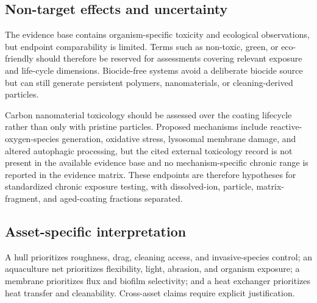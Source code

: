 \subsection{Non-target effects and uncertainty}
The evidence base contains organism-specific toxicity and ecological observations, but endpoint comparability is limited. Terms such as non-toxic, green, or eco-friendly should therefore be reserved for assessments covering relevant exposure and life-cycle dimensions. Biocide-free systems avoid a deliberate biocide source but can still generate persistent polymers, nanomaterials, or cleaning-derived particles.

Carbon nanomaterial toxicology should be assessed over the coating lifecycle rather than only with pristine particles. Proposed mechanisms include reactive-oxygen-species generation, oxidative stress, lysosomal membrane damage, and altered autophagic processing, but the cited external toxicology record is not present in the available evidence base and no mechanism-specific chronic range is reported in the evidence matrix. These endpoints are therefore hypotheses for standardized chronic exposure testing, with dissolved-ion, particle, matrix-fragment, and aged-coating fractions separated.

\subsection{Asset-specific interpretation}
A hull prioritizes roughness, drag, cleaning access, and invasive-species control; an aquaculture net prioritizes flexibility, light, abrasion, and organism exposure; a membrane prioritizes flux and biofilm selectivity; and a heat exchanger prioritizes heat transfer and cleanability. Cross-asset claims require explicit justification.
